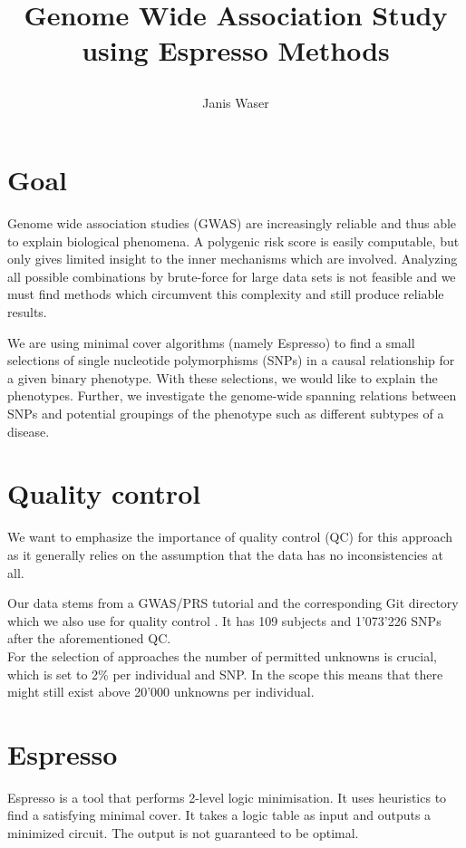 \documentclass[letterpaper, 11pt]{article}
\title{	

Genome Wide Association Study using Espresso Methods
}
\author{ Janis Waser}
\begin{document}
\maketitle




\section{Goal}
\label{sec:goal}
Genome wide association studies  (GWAS) are increasingly reliable and thus able to explain biological phenomena. A polygenic risk score is easily computable, but only gives limited insight to the inner mechanisms which are involved. Analyzing all possible combinations by brute-force for large data sets is not feasible and we must find methods which circumvent this complexity and still produce reliable results.

We are using minimal cover algorithms (namely Espresso) to find a small selections of single nucleotide polymorphisms (SNPs) in a causal relationship for a given binary phenotype.  With these selections, we would like to explain the phenotypes.  Further, we investigate the genome-wide spanning relations between SNPs and potential groupings of the phenotype such as different subtypes of a disease. 


\tableofcontents
\newpage
\section {Quality control}
We want to emphasize the importance of quality control (QC) for this approach as it generally relies on the assumption that the data has no inconsistencies at all. 

Our data stems from a GWAS/PRS tutorial and the corresponding Git directory which we also use for quality control \cite{tutorial}. It has 109 subjects and 1'073'226 SNPs after the aforementioned QC.  \\


For the selection of approaches the number of permitted unknowns is crucial, which is set to 2\% per individual and SNP. In the scope this means that there might still exist above 20'000 unknowns per individual. 

\section{Espresso}
Espresso is a tool that performs 2-level logic minimisation. It uses heuristics to find a satisfying minimal cover. It takes a logic table as input and outputs a minimized circuit.  The output is not guaranteed to be optimal. \\
\end{document}
